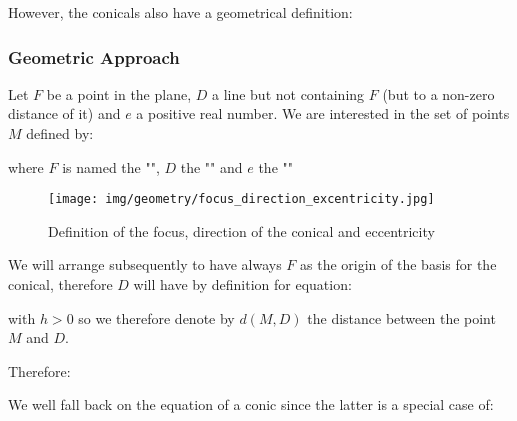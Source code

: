 	However, the conicals also have a geometrical definition:
	
	\pagebreak
	\subsubsection{Geometric Approach}
	Let $F$ be a point in the plane, $D$ a line but not containing $F$ (but to a non-zero distance of it) and $e$ a positive real number. We are interested in the set of points $M$ defined by:
	
	where $F$ is named the "", $D$ the "" and $e$ the ""
	\begin{figure}[H]
		\centering
		\texttt{[image: img/geometry/focus\_direction\_excentricity.jpg]}
		\caption{Definition of the focus, direction of the conical and eccentricity}
	\end{figure}
	We will arrange subsequently to have always $F$ as the origin of the basis for the conical, therefore $D$ will have by definition for equation:
	
	with $h>0$ so we therefore denote by $d (M, D)$ the distance between the point $M$ and $D$.
	
	Therefore:
	
	We well fall back on the equation of a conic since the latter is a special case of:
	
